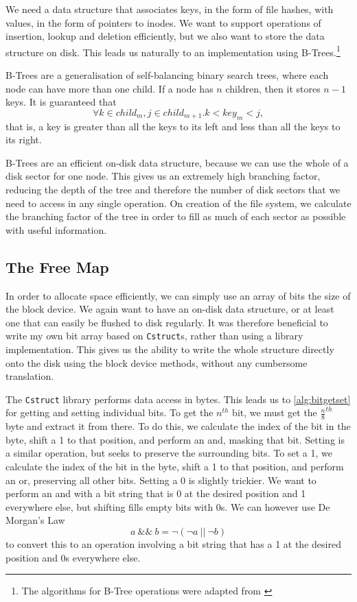 \documentclass[12pt,a4paper,twoside,openright]{report}
\begin{document}
We need a data structure that associates keys, in the form of file hashes, with values, in the form of pointers to inodes. We want to support operations of insertion, lookup and deletion efficiently, but we also want to store the data structure on disk. This leads us naturally to an implementation using B-Trees.\footnote{The algorithms for B-Tree operations were adapted from \cite{CLRS09}}

B-Trees are a generalisation of self-balancing binary search trees, where each node can have more than one child. If a node has $n$ children, then it stores $n-1$ keys. It is guaranteed that $$ \forall k \in child_m, j \in child_{m+1} . k < key_m < j, $$ that is, a key is greater than all the keys to its left and less than all the keys to its right. 

B-Trees are an efficient on-disk data structure, because we can use the whole of a disk sector for one node. This gives us an extremely high branching factor, reducing the depth of the tree and therefore the number of disk sectors that we need to access in any single operation. On creation of the file system, we calculate the branching factor of the tree in order to fill as much of each sector as possible with useful information.

\subsection{The Free Map}
\label{subsec:freemap}

In order to allocate space efficiently, we can simply use an array of bits the size of the block device. We again want to have an on-disk data structure, or at least one that can easily be flushed to disk regularly. It was therefore beneficial to write my own bit array based on \texttt{Cstruct}s, rather than using a library implementation. This gives us the ability to write the whole structure directly onto the disk using the block device methods, without any cumbersome translation.

The \texttt{Cstruct} library performs data access in bytes. This leads us to \cref{alg:bitgetset} for getting and setting individual bits. To get the $n^{th}$ bit, we must get the $\frac{n}{8}^{th}$ byte and extract it from there. To do this, we calculate the index of the bit in the byte, shift a 1 to that position, and perform an and, masking that bit. Setting is a similar operation, but seeks to preserve the surrounding bits. To set a 1, we calculate the index of the bit in the byte, shift a 1 to that position, and perform an or, preserving all other bits. Setting a 0 is slightly trickier. We want to perform an and with a bit string that is 0 at the desired position and 1 everywhere else, but shifting fills empty bits with 0s. We can however use De Morgan's Law $$ a~\&\&~b = \neg (\neg a~||~\neg b) $$ to convert this to an operation involving a bit string that has a 1 at the desired position and 0s everywhere else.
\end{document}

